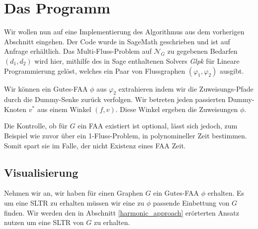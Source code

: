 \chapter{Das Programm}\label{the_program}

Wir wollen nun auf eine Implementierung des Algorithmus aus dem vorherigen Abschnitt eingehen. Der Code wurde in SageMath \cite{sage} geschrieben und ist auf Anfrage erhältlich. Das Multi-Fluss-Problem auf $\mathcal{N}_G$ zu gegebenen Bedarfen $(d_1,d_2)$ wird hier, mithilfe des in Sage enthaltenen Solvers \textit{Glpk} \cite{glpk} für Lineare Programmierung gelöst, welches ein Paar von Flussgraphen $(\varphi_1,\varphi_2)$ ausgibt.



Wir können ein Gutes-FAA $\phi$ aus $\varphi_2$ extrahieren indem wir die Zuweisungs-Pfade durch die Dummy-Senke zurück verfolgen. Wir betreten jeden passierten Dummy-Knoten $v^*$ aus einem Winkel $(f,v)$. Diese Winkel ergeben die Zuweisungen $\phi$. 

Die Kontrolle, ob für $G$ ein FAA existiert ist optional, lässt sich jedoch, zum Beispiel wie zuvor über ein 1-Fluss-Problem, in polynomineller Zeit bestimmen. Somit spart sie im Falle, der nicht Existenz eines FAA Zeit.

\section{Visualisierung}

Nehmen wir an, wir haben für einen Graphen $G$ ein Gutes-FAA $\phi$ erhalten. Es um eine SLTR zu erhalten müssen wir eine zu $\phi$ passende Einbettung von $G$ finden.  Wir werden den in Abschnitt \ref{harmonic_approach} erörterten Ansatz nutzen um eine SLTR von $G$ zu erhalten.

